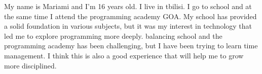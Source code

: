 My name is Mariami and I'm 16 years old. I live in tbilisi. I go to school and at the same time I attend the programming academy GOA. My school has provided a solid foundation in various subjects, but it was my interest in technology that led me to explore programming more deeply. balancing school and the programming academy has been challenging, but I have been trying to learn time management. I think this is also a good experience that will help me to grow more disciplined.
